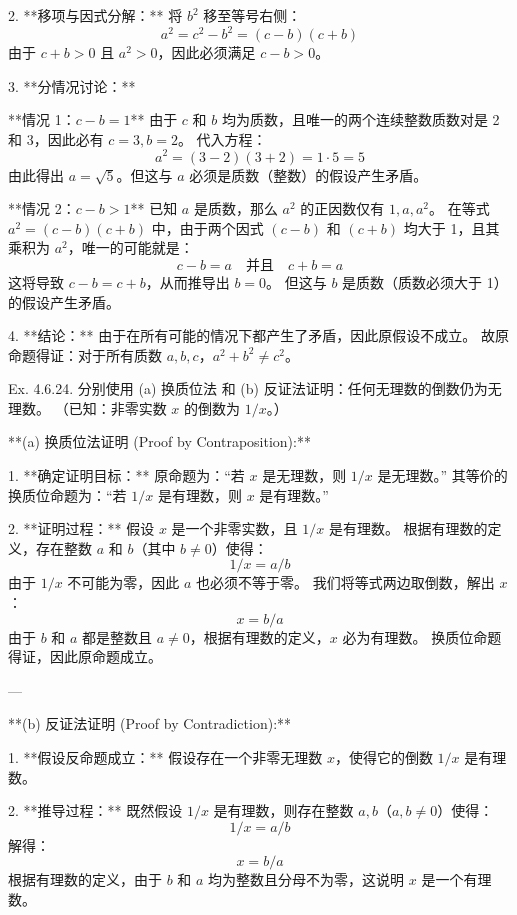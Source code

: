 \begin{questions}
\begin{solution}
2. **移项与因式分解：**
   将 $b^2$ 移至等号右侧：
   \[ a^2 = c^2 - b^2 = (c - b)(c + b) \]
   由于 $c + b > 0$ 且 $a^2 > 0$，因此必须满足 $c - b > 0$。

3. **分情况讨论：**

   **情况 1：$c - b = 1$**
   由于 $c$ 和 $b$ 均为质数，且唯一的两个连续整数质数对是 2 和 3，因此必有 $c = 3, b = 2$。
   代入方程：
   \[ a^2 = (3 - 2)(3 + 2) = 1 \cdot 5 = 5 \]
   由此得出 $a = \sqrt{5}$。但这与 $a$ 必须是质数（整数）的假设产生矛盾。

   **情况 2：$c - b > 1$**
   已知 $a$ 是质数，那么 $a^2$ 的正因数仅有 $1, a, a^2$。
   在等式 $a^2 = (c - b)(c + b)$ 中，由于两个因式 $(c - b)$ 和 $(c + b)$ 均大于 1，且其乘积为 $a^2$，唯一的可能就是：
   \[ c - b = a \quad \text{并且} \quad c + b = a \]
   这将导致 $c - b = c + b$，从而推导出 $b = 0$。
   但这与 $b$ 是质数（质数必须大于 1）的假设产生矛盾。

4. **结论：**
   由于在所有可能的情况下都产生了矛盾，因此原假设不成立。
   故原命题得证：对于所有质数 $a, b, c$，$a^2 + b^2 \neq c^2$。
\end{solution}

\question
Ex. 4.6.24. 分别使用 (a) 换质位法 和 (b) 反证法证明：任何无理数的倒数仍为无理数。
（已知：非零实数 $x$ 的倒数为 $1/x$。）

\begin{solution}
**(a) 换质位法证明 (Proof by Contraposition):**

1. **确定证明目标：**
   原命题为：“若 $x$ 是无理数，则 $1/x$ 是无理数。”
   其等价的换质位命题为：“若 $1/x$ 是有理数，则 $x$ 是有理数。”

2. **证明过程：**
   假设 $x$ 是一个非零实数，且 $1/x$ 是有理数。
   根据有理数的定义，存在整数 $a$ 和 $b$（其中 $b \neq 0$）使得：
   \[ 1/x = a/b \]
   由于 $1/x$ 不可能为零，因此 $a$ 也必须不等于零。
   我们将等式两边取倒数，解出 $x$：
   \[ x = b/a \]
   由于 $b$ 和 $a$ 都是整数且 $a \neq 0$，根据有理数的定义，$x$ 必为有理数。
   换质位命题得证，因此原命题成立。

---

**(b) 反证法证明 (Proof by Contradiction):**

1. **假设反命题成立：**
   假设存在一个非零无理数 $x$，使得它的倒数 $1/x$ 是有理数。

2. **推导过程：**
   既然假设 $1/x$ 是有理数，则存在整数 $a, b$（$a, b \neq 0$）使得：
   \[ 1/x = a/b \]
   解得：
   \[ x = b/a \]
   根据有理数的定义，由于 $b$ 和 $a$ 均为整数且分母不为零，这说明 $x$ 是一个有理数。


\end{solution}
\end{questions}
